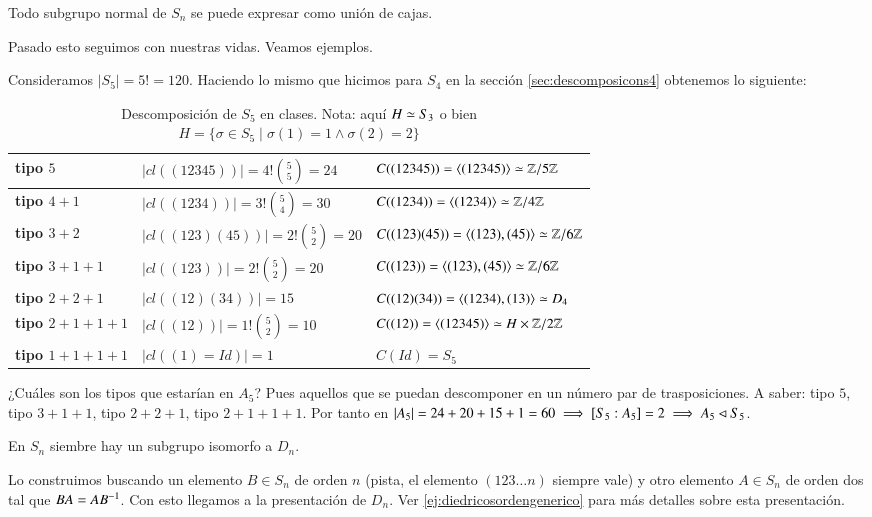 \begin{pro}
	Todo subgrupo normal de $S_n$ se puede expresar como unión de cajas.
\end{pro}

Pasado esto seguimos con nuestras vidas. Veamos ejemplos.

\begin{ej}
	Consideramos $|S_5| = 5! = 120$. Haciendo lo mismo que hicimos para $S_4$ en la sección \ref{sec:descomposicons4} obtenemos lo siguiente:
	\begin{table}[h]
		\centering
		{\renewcommand{\arraystretch}{1.3}
		\begin{tabular}{|l|l|l|}
			\hline
			\textbf{tipo $5$}       & $|cl((12345))| = 4! \binom{5}{5} = 24$   & $C((12345)) = \langle(12345)\rangle \simeq \mathbb{Z}/5\mathbb{Z}$       \\ \hline
			\textbf{tipo $4+1$}     & $|cl((1234))| = 3! \binom{5}{4} = 30$    & $C((1234)) = \langle(1234)\rangle \simeq \mathbb{Z}/4\mathbb{Z}$         \\ \hline
			\textbf{tipo $3+2$}     & $|cl((123)(45))| = 2! \binom{5}{2} = 20$ & $C((123)(45)) = \langle(123),(45)\rangle \simeq \mathbb{Z}/6\mathbb{Z}$  \\ \hline
			\textbf{tipo $3+1+1$}   & $|cl((123))| = 2! \binom{5}{2} = 20$     & $C((123)) = \langle(123),(45)\rangle \simeq \mathbb{Z}/6\mathbb{Z}$      \\ \hline
			\textbf{tipo $2+2+1$}   & $|cl((12)(34))| = 15$                    & $C((12)(34)) = \langle(1234),(13)\rangle \simeq D_4$     \\ \hline
			\textbf{tipo $2+1+1+1$} & $|cl((12))| = 1! \binom{5}{2} = 10$      & $C((12)) = \langle(12345)\rangle \simeq H \times \mathbb{Z}/2\mathbb{Z}$ \\ \hline
			\textbf{tipo $1+1+1+1$} & $|cl((1) = Id)| = 1$                     & $C(Id) = S_5$                                   \\ \hline
		\end{tabular}}
		\caption{Descomposición de $S_5$ en clases. Nota: aquí $H \simeq S_3$ o bien $H = \{\sigma \in S_5 \mid \sigma(1) = 1 \land \sigma(2) = 2\}$}
		\label{fig:descomposicons5}
	\end{table}

	¿Cuáles son los tipos que estarían en $A_5$? Pues aquellos que se puedan descomponer en un número par de trasposiciones. A saber: tipo $5$, tipo $3+1+1$, tipo $2+2+1$, tipo $2+1+1+1$. Por tanto en $|A_5| = 24 + 20 + 15 + 1 = 60 \implies [S_5:A_5] = 2 \implies A_5 \lhd S_5$.
\end{ej}

\begin{obs}
	En $S_n$ siembre hay un subgrupo isomorfo a $D_n$.
	
	Lo construimos buscando un elemento $B \in S_n$ de orden $n$ (pista, el elemento $(123\dots n)$ siempre vale) y otro elemento $A \in S_n$ de orden dos tal que $BA = AB^{-1}$. Con esto llegamos a la presentación de $D_n$. Ver \autoref{ej:diedricosordengenerico} para más detalles sobre esta presentación.
\end{obs}

